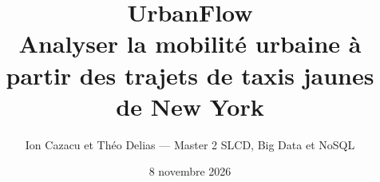 \documentclass[10pt,a4paper]{article}
\title{\vspace{-1.2cm}UrbanFlow\\\large Analyser la mobilité urbaine à partir des trajets de taxis jaunes de New York}
\author{Ion Cazacu et Théo Delias --- Master 2 SLCD, Big Data et NoSQL}
\date{8 novembre 2026}
\begin{document}
\maketitle\vspace{-1.0cm}










\label{fin-corps}
\clearpage\appendix

\end{document}
